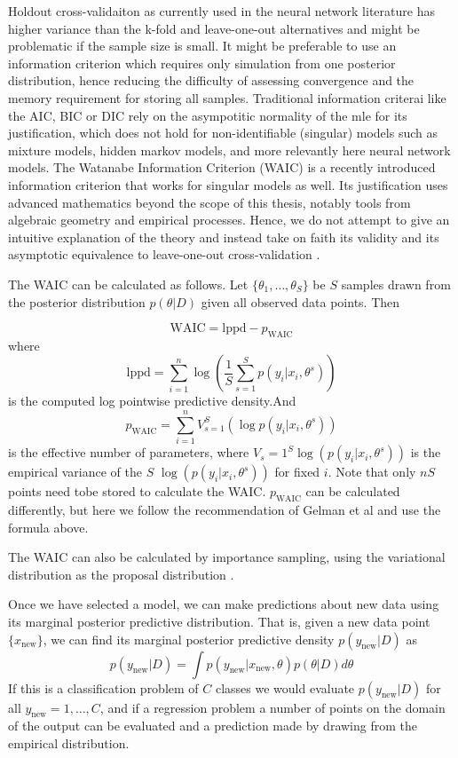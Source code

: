 \documentclass[12pt]{report}
\begin{document}
Holdout cross-validaiton as currently used in the neural network literature
has higher variance than the k-fold and leave-one-out alternatives and might be
problematic if the sample size is small. It might be
preferable to use an information criterion which requires only simulation from
one posterior distribution, hence reducing the difficulty of assessing convergence and the memory requirement for storing all samples. Traditional information criterai like the
AIC, BIC or DIC rely on the asympotitic normality of the mle for its
justification, which does not hold for non-identifiable (singular) models such
as mixture models, hidden markov models, and more relevantly here neural network
models. The Watanabe Information Criterion (WAIC) is a recently introduced information criterion that works for
singular models as well. Its justification uses advanced mathematics beyond the
scope of this thesis, notably tools from algebraic geometry and empirical
processes. Hence, we do not attempt to give an intuitive explanation of the
theory and instead take on faith its validity and its asymptotic equivalence to
leave-one-out cross-validation \cite{watanabe2010asymptotic}.

The WAIC can be calculated as follows. Let $\{\theta_1, \dots, \theta_S\}$ be $S$ samples drawn from the posterior distribution $p(\theta|D)$ given all observed data points. Then 

\[\text{WAIC} = \text{lppd} - p_{\text{WAIC}} \]
where 
\[\text{lppd} = \sum_{i=1}^n \log( \frac{1}{S} \sum_{s=1}^S p(y_i|x_i,\theta^s) ) \]
is the computed log pointwise predictive density.And 
\[p_{\text{WAIC}} = \sum_{i=1}^n V_{s=1}^S(\log p(y_i|x_i, \theta^s)) \]
is the effective number of parameters, where $V_s=1^S \log(p(y_i|x_i,\theta^s))$ is the empirical variance of the $S$  $\log(p(y_i|x_i,\theta^s))$ for fixed $i$. Note that only $nS$ points need tobe stored to calculate the WAIC. $p_{\text{WAIC}}$ can be calculated differently, but here we follow the recommendation of Gelman et al and use the formula above.

The WAIC can also be calculated by importance sampling, using the variational distribution as the proposal distribution \cite{yamada2012information}.

Once we have selected a model, we can make predictions about new data using its marginal posterior predictive distribution. That is, given a new data point $\{x_{\text{new}}\}$, we can find its marginal posterior predictive density $p(y_{\text{new}}|D)$ as 
\[ p(y_{\text{new}}|D) = \int p(y_{\text{new}}|x_{\text{new}},\theta) p(\theta|D) d\theta \]
If this is a classification problem of $C$ classes we would evaluate $p(y_{\text{new}}|D)$ for all $y_{\text{new}}=1,\dots, C$, and if a regression problem a number of points on the domain of the output can be evaluated 
and a prediction made by drawing from the empirical distribution. 
\end{document}
